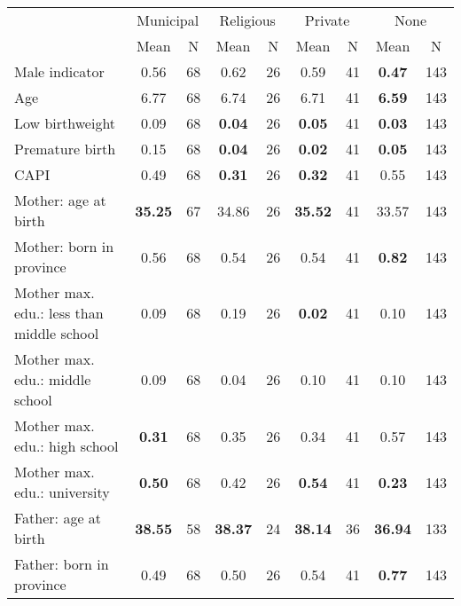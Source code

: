 \begin{tabular}{l c c c c c c c c}
\toprule
& \multicolumn{2}{c}{Municipal} & \multicolumn{2}{c}{Religious} & \multicolumn{2}{c}{Private} & \multicolumn{2}{c}{None} \\
& \scriptsize Mean & \scriptsize N & \scriptsize Mean & \scriptsize N & \scriptsize Mean & \scriptsize N & \scriptsize Mean & \scriptsize N \\
\midrule
Male indicator &      0.56 &        68 &      0.62 &        26 &      0.59 &        41 & \textbf{     0.47} &       143 \\
Age &      6.77 &        68 &      6.74 &        26 &      6.71 &        41 & \textbf{     6.59} &       143 \\
Low birthweight &      0.09 &        68 & \textbf{     0.04} &        26 & \textbf{     0.05} &        41 & \textbf{     0.03} &       143 \\
Premature birth &      0.15 &        68 & \textbf{     0.04} &        26 & \textbf{     0.02} &        41 & \textbf{     0.05} &       143 \\
CAPI &      0.49 &        68 & \textbf{     0.31} &        26 & \textbf{     0.32} &        41 &      0.55 &       143 \\
Mother: age at birth & \textbf{    35.25} &        67 &     34.86 &        26 & \textbf{    35.52} &        41 &     33.57 &       143 \\
Mother: born in province &      0.56 &        68 &      0.54 &        26 &      0.54 &        41 & \textbf{     0.82} &       143 \\
Mother max. edu.: less than middle school &      0.09 &        68 &      0.19 &        26 & \textbf{     0.02} &        41 &      0.10 &       143 \\
Mother max. edu.: middle school &      0.09 &        68 &      0.04 &        26 &      0.10 &        41 &      0.10 &       143 \\
Mother max. edu.: high school & \textbf{     0.31} &        68 &      0.35 &        26 &      0.34 &        41 &      0.57 &       143 \\
Mother max. edu.: university & \textbf{     0.50} &        68 &      0.42 &        26 & \textbf{     0.54} &        41 & \textbf{     0.23} &       143 \\
Father: age at birth & \textbf{    38.55} &        58 & \textbf{    38.37} &        24 & \textbf{    38.14} &        36 & \textbf{    36.94} &       133 \\
Father: born in province &      0.49 &        68 &      0.50 &        26 &      0.54 &        41 & \textbf{     0.77} &       143 \\

\end{tabular}
